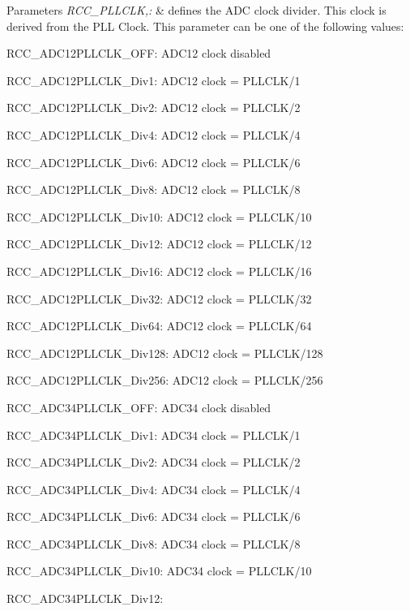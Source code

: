 \begin{DoxyParams}{Parameters}
{\em R\-C\-C\-\_\-\-P\-L\-L\-C\-L\-K,\-:} & defines the A\-D\-C clock divider. This clock is derived from the P\-L\-L Clock. This parameter can be one of the following values\-: \begin{DoxyItemize}
\item R\-C\-C\-\_\-\-A\-D\-C12\-P\-L\-L\-C\-L\-K\-\_\-\-O\-F\-F\-: A\-D\-C12 clock disabled \item R\-C\-C\-\_\-\-A\-D\-C12\-P\-L\-L\-C\-L\-K\-\_\-\-Div1\-: A\-D\-C12 clock = P\-L\-L\-C\-L\-K/1 \item R\-C\-C\-\_\-\-A\-D\-C12\-P\-L\-L\-C\-L\-K\-\_\-\-Div2\-: A\-D\-C12 clock = P\-L\-L\-C\-L\-K/2 \item R\-C\-C\-\_\-\-A\-D\-C12\-P\-L\-L\-C\-L\-K\-\_\-\-Div4\-: A\-D\-C12 clock = P\-L\-L\-C\-L\-K/4 \item R\-C\-C\-\_\-\-A\-D\-C12\-P\-L\-L\-C\-L\-K\-\_\-\-Div6\-: A\-D\-C12 clock = P\-L\-L\-C\-L\-K/6 \item R\-C\-C\-\_\-\-A\-D\-C12\-P\-L\-L\-C\-L\-K\-\_\-\-Div8\-: A\-D\-C12 clock = P\-L\-L\-C\-L\-K/8 \item R\-C\-C\-\_\-\-A\-D\-C12\-P\-L\-L\-C\-L\-K\-\_\-\-Div10\-: A\-D\-C12 clock = P\-L\-L\-C\-L\-K/10 \item R\-C\-C\-\_\-\-A\-D\-C12\-P\-L\-L\-C\-L\-K\-\_\-\-Div12\-: A\-D\-C12 clock = P\-L\-L\-C\-L\-K/12 \item R\-C\-C\-\_\-\-A\-D\-C12\-P\-L\-L\-C\-L\-K\-\_\-\-Div16\-: A\-D\-C12 clock = P\-L\-L\-C\-L\-K/16 \item R\-C\-C\-\_\-\-A\-D\-C12\-P\-L\-L\-C\-L\-K\-\_\-\-Div32\-: A\-D\-C12 clock = P\-L\-L\-C\-L\-K/32 \item R\-C\-C\-\_\-\-A\-D\-C12\-P\-L\-L\-C\-L\-K\-\_\-\-Div64\-: A\-D\-C12 clock = P\-L\-L\-C\-L\-K/64 \item R\-C\-C\-\_\-\-A\-D\-C12\-P\-L\-L\-C\-L\-K\-\_\-\-Div128\-: A\-D\-C12 clock = P\-L\-L\-C\-L\-K/128 \item R\-C\-C\-\_\-\-A\-D\-C12\-P\-L\-L\-C\-L\-K\-\_\-\-Div256\-: A\-D\-C12 clock = P\-L\-L\-C\-L\-K/256 \item R\-C\-C\-\_\-\-A\-D\-C34\-P\-L\-L\-C\-L\-K\-\_\-\-O\-F\-F\-: A\-D\-C34 clock disabled \item R\-C\-C\-\_\-\-A\-D\-C34\-P\-L\-L\-C\-L\-K\-\_\-\-Div1\-: A\-D\-C34 clock = P\-L\-L\-C\-L\-K/1 \item R\-C\-C\-\_\-\-A\-D\-C34\-P\-L\-L\-C\-L\-K\-\_\-\-Div2\-: A\-D\-C34 clock = P\-L\-L\-C\-L\-K/2 \item R\-C\-C\-\_\-\-A\-D\-C34\-P\-L\-L\-C\-L\-K\-\_\-\-Div4\-: A\-D\-C34 clock = P\-L\-L\-C\-L\-K/4 \item R\-C\-C\-\_\-\-A\-D\-C34\-P\-L\-L\-C\-L\-K\-\_\-\-Div6\-: A\-D\-C34 clock = P\-L\-L\-C\-L\-K/6 \item R\-C\-C\-\_\-\-A\-D\-C34\-P\-L\-L\-C\-L\-K\-\_\-\-Div8\-: A\-D\-C34 clock = P\-L\-L\-C\-L\-K/8 \item R\-C\-C\-\_\-\-A\-D\-C34\-P\-L\-L\-C\-L\-K\-\_\-\-Div10\-: A\-D\-C34 clock = P\-L\-L\-C\-L\-K/10 \item R\-C\-C\-\_\-\-A\-D\-C34\-P\-L\-L\-C\-L\-K\-\_\-\-Div12\-: 
\end{DoxyItemize}
\end{DoxyParams}
